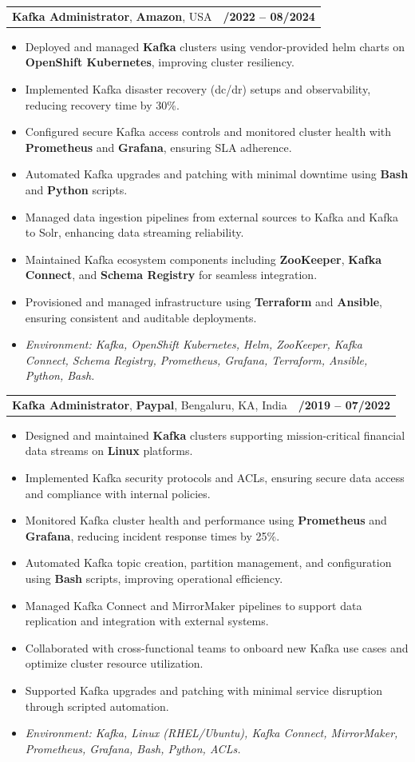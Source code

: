 \documentclass[letterpaper,11pt]{article}
\makeatletter
\newcommand{\resumeItem}[1]{
  \item\footnotesize{
    {#1 \vspace{-2pt}}
  }
}
\newcommand{\resumeSubheading}[4]{
  \vspace{-2pt}\item
    \begin{tabular*}{1.0\textwidth}[t]{l@{\extracolsep{\fill}}r}
      \textbf{\fontsize{10pt}{14pt}\selectfont #3}, \textbf{\fontsize{10pt}{14pt}\selectfont #1}, \fontsize{10pt}{14pt}\selectfont #4 & \textbf{\fontsize{10pt}{14pt}\selectfont #2} \\
    \end{tabular*}\vspace{-7pt}
}
\newcommand{\resumeItemListStart}{\begin{itemize}[leftmargin=*]}
\newcommand{\resumeItemListEnd}{\end{itemize}\vspace{-5pt}}
\makeatother
\begin{document}
\resumeSubheading
{Amazon}{10/2022 -- 08/2024}
{Kafka Administrator}{USA}
\resumeItemListStart
  \resumeItem{Deployed and managed \textbf{Kafka} clusters using vendor-provided helm charts on \textbf{OpenShift Kubernetes}, improving cluster resiliency.}
  \resumeItem{Implemented Kafka disaster recovery (dc/dr) setups and observability, reducing recovery time by 30\%.}
  \resumeItem{Configured secure Kafka access controls and monitored cluster health with \textbf{Prometheus} and \textbf{Grafana}, ensuring SLA adherence.}
  \resumeItem{Automated Kafka upgrades and patching with minimal downtime using \textbf{Bash} and \textbf{Python} scripts.}
  \resumeItem{Managed data ingestion pipelines from external sources to Kafka and Kafka to Solr, enhancing data streaming reliability.}
  \resumeItem{Maintained Kafka ecosystem components including \textbf{ZooKeeper}, \textbf{Kafka Connect}, and \textbf{Schema Registry} for seamless integration.}
  \resumeItem{Provisioned and managed infrastructure using \textbf{Terraform} and \textbf{Ansible}, ensuring consistent and auditable deployments.}
  \resumeItem{\textit{Environment: Kafka, OpenShift Kubernetes, Helm, ZooKeeper, Kafka Connect, Schema Registry, Prometheus, Grafana, Terraform, Ansible, Python, Bash.}}
\resumeItemListEnd

\resumeSubheading
{Paypal}{08/2019 -- 07/2022}
{Kafka Administrator}{Bengaluru, KA, India}
\resumeItemListStart
  \resumeItem{Designed and maintained \textbf{Kafka} clusters supporting mission-critical financial data streams on \textbf{Linux} platforms.}
  \resumeItem{Implemented Kafka security protocols and ACLs, ensuring secure data access and compliance with internal policies.}
  \resumeItem{Monitored Kafka cluster health and performance using \textbf{Prometheus} and \textbf{Grafana}, reducing incident response times by 25\%.}
  \resumeItem{Automated Kafka topic creation, partition management, and configuration using \textbf{Bash} scripts, improving operational efficiency.}
  \resumeItem{Managed Kafka Connect and MirrorMaker pipelines to support data replication and integration with external systems.}
  \resumeItem{Collaborated with cross-functional teams to onboard new Kafka use cases and optimize cluster resource utilization.}
  \resumeItem{Supported Kafka upgrades and patching with minimal service disruption through scripted automation.}
  \resumeItem{\textit{Environment: Kafka, Linux (RHEL/Ubuntu), Kafka Connect, MirrorMaker, Prometheus, Grafana, Bash, Python, ACLs.}}
\resumeItemListEnd
\end{document}

